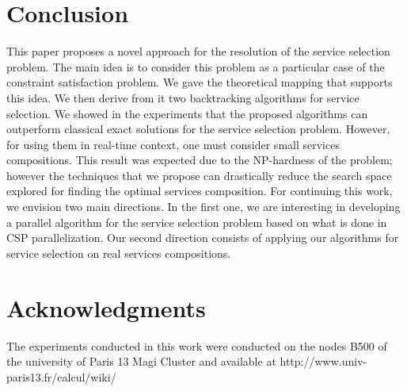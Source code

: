 \documentclass[a4paper]{article}
\begin{document}
\section{Conclusion} \label{Conclusion}

This paper proposes a novel approach for the resolution of the service selection problem. 
The main idea is to consider this problem as a particular case of the constraint satisfaction 
problem. We gave the theoretical mapping that supports this idea. We then derive from it two backtracking 
algorithms for service selection. We showed in the experiments that the proposed algorithms can 
outperform classical exact solutions for the service selection problem. However, for using them in 
real-time context, one must consider small services compositions. This result was expected due to the 
NP-hardness of the problem; however the techniques that we propose can drastically reduce the search 
space explored for finding the optimal services composition. 
 For continuing this work, we envision 
two main directions. In the first one, we are interesting in developing a parallel algorithm for the 
service selection problem based on what is done in CSP parallelization. Our second direction consists of 
applying our algorithms for service selection on real services compositions. 

\section*{Acknowledgments}

The experiments conducted in this work were conducted on the nodes B500 of the university of Paris 13 
Magi Cluster and available at http://www.univ-paris13.fr/calcul/wiki/



\end{document}
